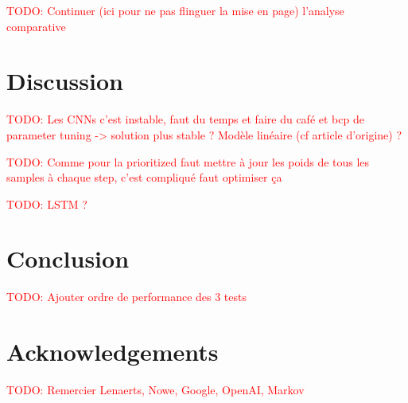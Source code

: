 \documentclass[letterpaper]{article}
\newcommand\todo[1]{\textcolor{red}{TODO: #1}}
\begin{document}
\todo{Continuer (ici pour ne pas flinguer la mise en page) l'analyse comparative}

\section{Discussion}

\todo{Les CNNs c'est instable, faut du temps et faire du café et bcp de parameter tuning -> solution plus stable ? Modèle linéaire (cf article d'origine) ?}

\todo{Comme pour la prioritized faut mettre à jour les poids de tous les samples à chaque step, c'est compliqué faut optimiser ça}

\todo{LSTM ?}

\section{Conclusion}

	\todo{Ajouter ordre de performance des 3 tests}

\section{Acknowledgements}

  \todo{Remercier Lenaerts, Nowe, Google, OpenAI, Markov}

\footnotesize


\end{document}
